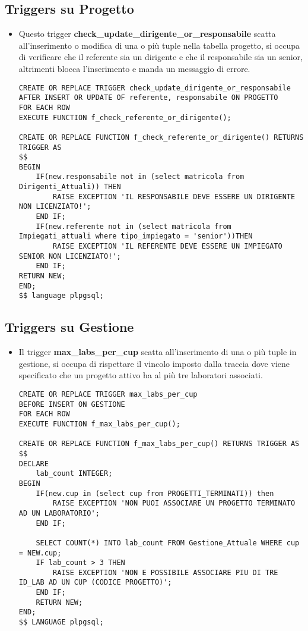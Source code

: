 \subsection{Triggers su Progetto}
    \begin{itemize}
    
\normalsize
\item Questo trigger \textbf{check\_update\_dirigente\_or\_responsabile} scatta all'inserimento o modifica di una o più tuple nella tabella progetto, si occupa di verificare che il referente sia un dirigente e che il responsabile sia un senior, altrimenti blocca l'inserimento e manda un messaggio di errore.
\scriptsize
\begin{lstlisting}
CREATE OR REPLACE TRIGGER check_update_dirigente_or_responsabile
AFTER INSERT OR UPDATE OF referente, responsabile ON PROGETTO
FOR EACH ROW
EXECUTE FUNCTION f_check_referente_or_dirigente();

CREATE OR REPLACE FUNCTION f_check_referente_or_dirigente() RETURNS TRIGGER AS
$$
BEGIN
	IF(new.responsabile not in (select matricola from Dirigenti_Attuali)) THEN
		RAISE EXCEPTION 'IL RESPONSABILE DEVE ESSERE UN DIRIGENTE NON LICENZIATO!';
	END IF;
	IF(new.referente not in (select matricola from Impiegati_attuali where tipo_impiegato = 'senior'))THEN
		RAISE EXCEPTION 'IL REFERENTE DEVE ESSERE UN IMPIEGATO SENIOR NON LICENZIATO!';
	END IF;
RETURN NEW;
END;
$$ language plpgsql;
\end{lstlisting}
 
\end{itemize}
\newpage




\subsection{Triggers su Gestione}
    \begin{itemize}
    
\normalsize
\item Il trigger \textbf{max\_labs\_per\_cup} scatta all'inserimento di una o più tuple in gestione, si occupa di rispettare il vincolo imposto dalla traccia dove viene specificato che un progetto attivo ha al più tre laboratori associati.
\scriptsize
\begin{lstlisting}
CREATE OR REPLACE TRIGGER max_labs_per_cup
BEFORE INSERT ON GESTIONE
FOR EACH ROW
EXECUTE FUNCTION f_max_labs_per_cup();

CREATE OR REPLACE FUNCTION f_max_labs_per_cup() RETURNS TRIGGER AS
$$
DECLARE
    lab_count INTEGER;
BEGIN
	IF(new.cup in (select cup from PROGETTI_TERMINATI)) then
		RAISE EXCEPTION 'NON PUOI ASSOCIARE UN PROGETTO TERMINATO AD UN LABORATORIO';
	END IF;

    SELECT COUNT(*) INTO lab_count FROM Gestione_Attuale WHERE cup = NEW.cup;
    IF lab_count > 3 THEN
        RAISE EXCEPTION 'NON E POSSIBILE ASSOCIARE PIU DI TRE ID_LAB AD UN CUP (CODICE PROGETTO)';
    END IF;
    RETURN NEW;
END;
$$ LANGUAGE plpgsql;

\end{lstlisting}
 
\end{itemize}
\newpage






